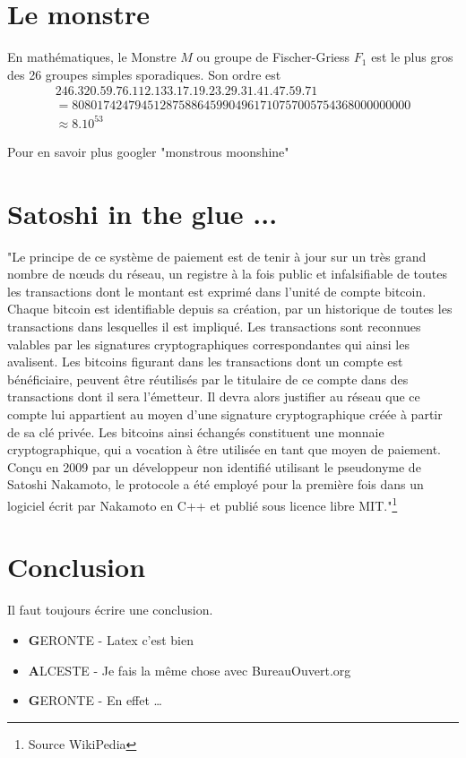 \documentclass[twocolumn,a4paper]{IEEEtranfr}
\begin{document}
{\section{Le monstre}
En mathématiques, le Monstre $M$ ou groupe de Fischer-Griess $F_1$ est le plus gros des 26 groupes simples sporadiques. Son ordre est
\begin{eqnarray*}
246.320.59.76.112.133.17.19.23.29.31.41.47.59.71 \\
= 808 017 424 794 512 875 886 459 904 961 710 757 005 754 368 000 000 000 \\
\approx 8.10^{53}
\end{eqnarray*}

Pour en savoir plus googler "monstrous moonshine"

\section{Satoshi in the glue ...}
"Le principe de ce système de paiement est de tenir à jour sur un très grand nombre de nœuds du réseau, un registre à la fois public et infalsifiable de toutes les transactions dont le montant est exprimé dans l'unité de compte bitcoin. Chaque bitcoin est identifiable depuis sa création, par un historique de toutes les transactions dans lesquelles il est impliqué. Les transactions sont reconnues valables par les signatures cryptographiques correspondantes qui ainsi les avalisent. Les bitcoins figurant dans les transactions dont un compte est bénéficiaire, peuvent être réutilisés par le titulaire de ce compte dans des transactions dont il sera l'émetteur. Il devra alors justifier au réseau que ce compte lui appartient au moyen d'une signature cryptographique créée à partir de sa clé privée. Les bitcoins ainsi échangés constituent une monnaie cryptographique, qui a vocation à être utilisée en tant que moyen de paiement.
Conçu en 2009 par un développeur non identifié utilisant le pseudonyme de Satoshi Nakamoto, le protocole a été employé pour la première fois dans un logiciel écrit par Nakamoto en C++ et publié sous licence libre MIT."\footnote{Source WikiPedia}
\section{Conclusion}
Il faut toujours écrire une conclusion. 
\begin{itemize}
  \item {\textbf GERONTE} - Latex c'est bien 
  \item {\textbf ALCESTE} - Je fais la même chose avec BureauOuvert.org
  \item {\textbf GERONTE} - En effet \dots
\end{itemize}
% 
%


}
\end{document}
